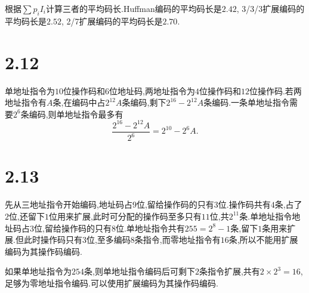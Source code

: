 \documentclass[adobefonts, nocap]{ctexart}
\begin{document}
    根据$\sum p_{i}I_{i}$计算三者的平均码长.Huffman编码的平均码长是$2.42$, 3/3/3扩展编码的平均码长是$2.52$, 2/7扩展编码的平均码长是$2.70$.
  \section*{2.12}
    单地址指令为$10$位操作码和$6$位地址码,两地址指令为$4$位操作码和$12$位操作码.若两地址指令有$A$条,在编码中占$2^{12}A$条编码,剩下$2^{16}-2^{12}A$条编码.一条单地址指令需要$2^{6}$条编码,则单地址指令最多有
    \[
      \frac{2^{16}-2^{12}A}{2^{6}}=2^{10}-2^{6}A.
    \]
  \section*{2.13}
    先从三地址指令开始编码,地址码占$9$位,留给操作码的只有$3$位.操作码共有$4$条,占了$2$位,还留下$1$位用来扩展,此时可分配的操作码至多只有$11$位,共$2^{11}$条.单地址指令地址码占$3$位,留给操作码的只有$8$位.单地址指令共有$255=2^{8}-1$条,留下$1$条用来扩展.但此时操作码只有$3$位,至多编码$8$条指令,而零地址指令有$16$条,所以不能用扩展编码为其操作码编码.

    如果单地址指令为$254$条,则单地址指令编码后可剩下$2$条指令扩展,共有$2\times 2^{3}=16$,足够为零地址指令编码.可以使用扩展编码为其操作码编码.
\end{document}
